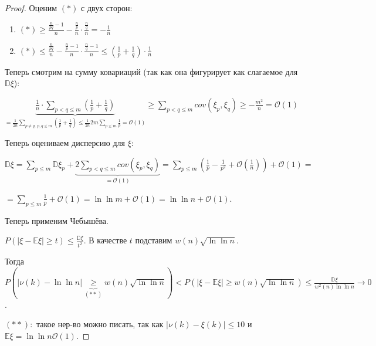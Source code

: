 \begin{proof}
    Оценим $(*)$ с двух сторон:

    \begin{enumerate}
        \item {
            $(*) \geq \frac{\frac{n}{pq} - 1}{n} - \frac{\frac{n}{p}}{n} \cdot \frac{\frac{n}{q}}{n} = -\frac{1}{n}$
        }
        \item {
            $(*) \leq \frac{\frac{n}{pq}}{n} - \frac{\frac{n}{p} - 1}{n} \cdot \frac{\frac{n}{q} - 1}{n} \leq (\frac{1}{p} + \frac{1}{q}) \cdot \frac{1}{n}$
        }
    \end{enumerate}

    Теперь смотрим на сумму ковариаций (так как она фигурирует как слагаемое для $\mathbb{D} \xi$):

    $\underbrace{\frac{1}{n} \cdot \sum_{p < q \leq m} \left(\frac{1}{p} + \frac{1}{q}\right)}_{=\frac{1}{2n} \sum_{p \neq q, \ p, q \leq m} \left(\frac{1}{p} + \frac{1}{q}\right) \leq \frac{1}{2n} 2 m \sum_{p \leq m} \frac{1}{p} = \mathcal{O}(1)} \geq \sum_{p < q \leq m} cov(\xi_p, \xi_q) \geq - \frac{m^2}{n} = \mathcal{O}(1)$

    Теперь оцениваем дисперсию для $\xi$:

    $\mathbb{D} \xi = \sum_{p \leq m} \mathbb{D} \xi_p + \underbrace{2 \sum_{p < q \leq m} cov(\xi_p, \xi_q)}_{=\mathcal{O}(1)} = \sum_{p \leq m} \left(\frac{1}{p} - \frac{1}{p^2} + \mathcal{O}(\frac{1}{n})\right) + \mathcal{O}(1) =$
    
    $= \sum_{p \leq m} \frac{1}{p} + \mathcal{O}(1) = \ln \ln m + \mathcal{O}(1) = \ln \ln n + \mathcal{O}(1)$.


    
    Теперь применим Чебышёва.

    $P(|\xi - \mathbb{E} \xi| \geqslant t) \leqslant \frac{\mathbb{D}\xi}{t^2}$. В качестве $t$ подставим $w(n) \sqrt{\ln \ln n}$.

    Тогда $P (|\nu(k) - \ln \ln n| \underbrace{\geqslant}_{(**)} w(n) \sqrt{\ln \ln n}) < P(|\xi - \mathbb{E} \xi| \geqslant w(n) \sqrt{\ln \ln n}) \leqslant \frac{\mathbb{D}\xi}{w^2(n) \ln \ln n} \to 0$.

    $(**):$ такое нер-во можно писать, так как $|\nu(k) - \xi(k)| \leq 10$ и $\mathbb{E} \xi = \ln \ln n \mathcal{O}(1)$.

\end{proof}

